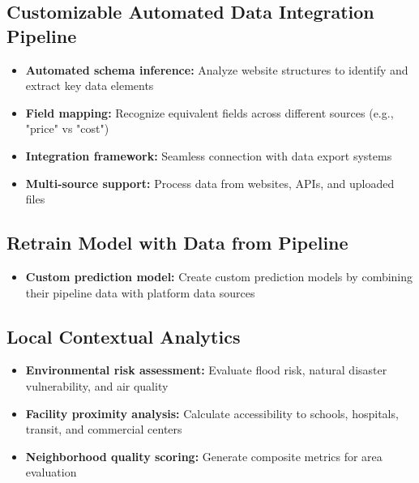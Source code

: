 \subsection{Customizable Automated Data Integration Pipeline}  
\begin{itemize}  
    \item \textbf{Automated schema inference:} Analyze website structures to identify and extract key data elements  
    \item \textbf{Field mapping:} Recognize equivalent fields across different sources (e.g., "price" vs "cost")  
    \item \textbf{Integration framework:} Seamless connection with data export systems  
    \item \textbf{Multi-source support:} Process data from websites, APIs, and uploaded files  
\end{itemize}  

\subsection{Retrain Model with Data from Pipeline}  
\begin{itemize}  
    \item \textbf{Custom prediction model:} Create custom prediction models by combining their pipeline data with platform data sources
\end{itemize}

\subsection{Local Contextual Analytics}  
\begin{itemize}  
    \item \textbf{Environmental risk assessment:} Evaluate flood risk, natural disaster vulnerability, and air quality  
    \item \textbf{Facility proximity analysis:} Calculate accessibility to schools, hospitals, transit, and commercial centers  
    \item \textbf{Neighborhood quality scoring:} Generate composite metrics for area evaluation  
\end{itemize}  
  
